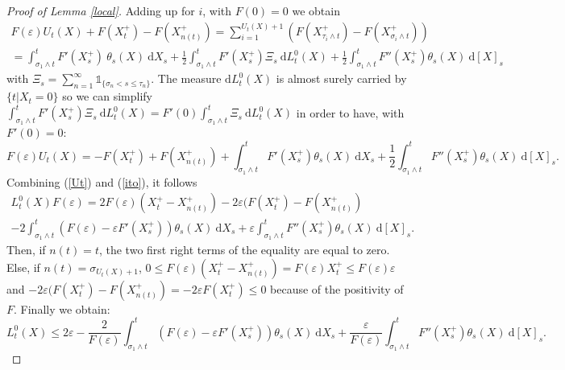 \documentclass[11pt]{enstaPRE}
\newcommand{\di}{\mathrm{d}}
\begin{document}
\begin{proof}[Proof of Lemma \ref{local}]
    Adding up for $i$, with $F(0) = 0$ we obtain
    \begin{multline*}
    F(\varepsilon)U_t(X)+F\left(X^+_t\right)-F\left(X^+_{n(t)}\right) = \sum_{i=1}^{U_t(X)+1} \left(F\left(X^+_{\tau_i\wedge t}\right) - F\left(X^+_{\sigma_i\wedge t}\right)\right)\\=\int_{\sigma_1\wedge t}^{ t} F'(X_s^+)\ \theta_s(X)\ \di X_s + \frac{1}{2}\int_{\sigma_1\wedge t}^{t} F'\left(X_s^+\right)\Xi_s\ \di L^0_t(X) + \frac{1}{2}\int_{\sigma_1\wedge t}^{t} F''\left(X_s^+\right)\theta_s(X)\ \di [X]_s
    \end{multline*}
    with $\Xi_s = \sum_{n=1}^\infty \mathds{1}_{\{\sigma_n<s\leq\tau_n\}}$.
    The measure $\di L^0_t(X)$ is almost surely carried by $\{t|X_t=0\}$ so we can simplify $\int_{\sigma_1\wedge t}^{t} F'\left(X_s^+\right)\Xi_s\ \di L^0_t(X) =F'(0)\int_{\sigma_1\wedge t}^{t} \Xi_s\ \di L^0_t(X)$ in order to have, with $F'(0)=0$:
    \begin{equation}\label{ito}
    F(\varepsilon)U_t(X) = - F\left(X^+_t\right) + F\left(X^+_{n(t)}\right) + \int_{\sigma_1\wedge t}^{ t} F'\left(X_s^+\right) \theta_s(X)\ \di X_s + \frac{1}{2}\int_{\sigma_1\wedge t}^{t} F''\left(X_s^+\right) \theta_s(X)\ \di [X]_s.
    \end{equation}
    Combining (\ref{Ut}) and (\ref{ito}), it follows
    \begin{multline*}
    L^0_t(X) F(\varepsilon) = 2 F(\varepsilon)(X^+_t-X^+_{n(t)})-2\varepsilon(F\left(X^+_t\right)-F\left(X^+_{n(t)}\right)\\-2\int_{\sigma_1\wedge t}^{ t} \left(F(\varepsilon) - \varepsilon F'\left(X_s^+\right)\right) \theta_s(X)\ \di X_s + \varepsilon\int_{\sigma_1\wedge t}^{t} F''\left(X_s^+\right)\theta_s(X)\ \di [X]_s.
    \end{multline*}
    Then, if $n(t) = t$, the two first right terms of the equality are equal to zero. Else, if $n(t) = \sigma_{U_t(X)+1}$, $0\leq F(\varepsilon)(X^+_t-X^+_{n(t)})=F(\varepsilon)X^+_t\leq F(\varepsilon)\varepsilon$ and $-2\varepsilon(F\left(X^+_t\right)-F\left(X^+_{n(t)}\right)=-2\varepsilon F\left(X^+_t\right)\leq0$ because of the positivity of $F$. Finally we obtain:
    \begin{equation*}
    L^0_t(X) \leq 2 \varepsilon-\frac{2}{F(\varepsilon)}\int_{\sigma_1\wedge t}^{ t} \left(F(\varepsilon) - \varepsilon F'\left(X_s^+\right)\right) \theta_s(X)\ \di X_s + \frac{\varepsilon}{F(\varepsilon)}\int_{\sigma_1\wedge t}^{t} F''\left(X_s^+\right)\theta_s(X)\ \di [X]_s.
    \end{equation*}
\end{proof}
\end{document}
